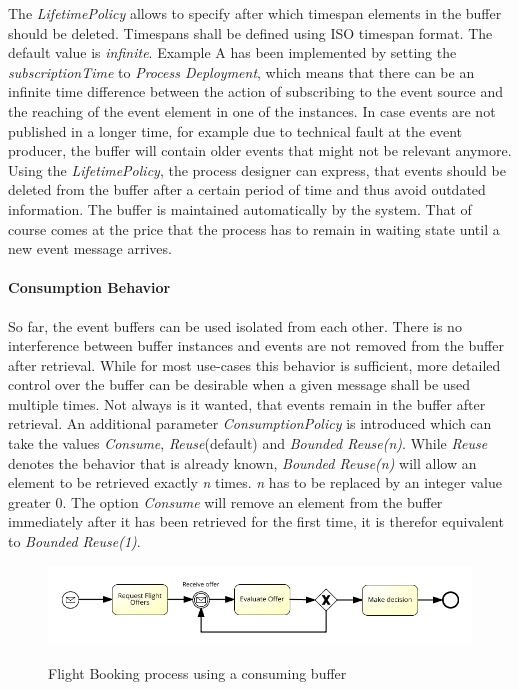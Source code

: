 The \textit{LifetimePolicy} allows to specify after which timespan elements in the buffer should be deleted. Timespans shall be defined using ISO timespan format. 
The default value is \textit{infinite}.
Example A has been implemented by setting the \textit{subscriptionTime} to \textit{Process Deployment}, which means that there can be an infinite time difference between the action of subscribing to the event source and the reaching of the event element in one of the instances. 
In case events are not published in a longer time, for example due to technical fault at the event producer, the buffer will contain older events that might not be relevant anymore.
Using the \textit{LifetimePolicy}, the process designer can express, that events should be deleted from the buffer after a certain period of time and thus avoid outdated information. The buffer is maintained automatically by the system.
That of course comes at the price that the process has to remain in waiting state until a new event message arrives.

\paragraph{Consumption Behavior\newline}

So far, the event buffers can be used isolated from each other. There is no interference between buffer instances and events are not removed from the buffer after retrieval.
While for most use-cases this behavior is sufficient, more detailed control over the buffer can be desirable when a given message shall be used multiple times.
Not always is it wanted, that events remain in the buffer after retrieval.
An additional parameter \textit{ConsumptionPolicy} is introduced which can take the values \textit{Consume}, \textit{Reuse}(default) and \textit{Bounded Reuse(n)}.
While \textit{Reuse} denotes the behavior that is already known, \textit{Bounded Reuse(n)} will allow an element to be retrieved exactly \textit{n} times. \textit{n} has to be replaced by an integer value greater 0.
The option \textit{Consume} will remove an element from the buffer immediately after it has been retrieved for the first time, it is therefor equivalent to \textit{Bounded Reuse(1)}.


\begin{figure}[]
	\myfloatalign
	{\includegraphics[width=1\linewidth]{chapters/concept/bpmnx/FlightBooking.png}}
	\caption{Flight Booking process using a consuming buffer}\label{fig:example-flightbooking}
\end{figure}



